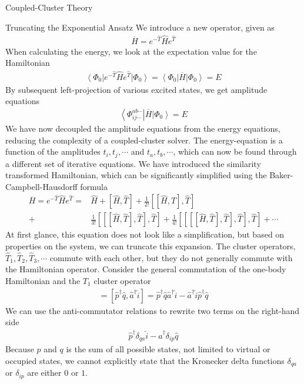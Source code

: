 \documentclass[twoside,english]{uiofysmaster}
\begin{document}
\begin{chapter}{Coupled-Cluster Theory}
\begin{section}{Truncating the Exponential Ansatz}
	  	We introduce a new operator, given as 
	  	\begin{align}
	  		\overline H = e^{-\hat T} \hat H e^{\hat T} 
	  	\end{align}
	  	When calculating the energy, we look at the expectation value for the Hamiltonian 
	  	\begin{align}
	  		\left< \Phi_0 \right| e^{-\hat T} \hat H e^{\hat T} \left| \Phi_0 \right> = \left< \Phi_0 \right| \overline H \left| \Phi_0 \right> = E
	  	\end{align}
	  	By subsequent left-projection of various excited states, we get amplitude equations
	  	\begin{align}
	  		\left< \Phi_{ij\cdots}^{ab\cdots} \right| \overline H \left| \Phi_0 \right> = E
	  	\end{align}
	  	We have now decoupled the amplitude equations from the energy equations, reducing the complexity of a coupled-cluster solver. The energy-equation is a function of the amplitudes $t_i, t_j, \cdots$ and $t_a, t_b, \cdots$, which can now be found through a different set of iterative equations. We have introduced the similarity transformed Hamiltonian, which can be significantly simplified using the Baker-Campbell-Hausdorff formula \cite{Crawford}
	  	\begin{align}
	  		\overline H = e^{-\hat T} \hat H e^{\hat T} =& \hat H + [ \hat H, \hat T] + \frac{1}{2!} [[\hat H, \hat T], \hat T] \\ + &\frac{1}{3!} [[[ \hat H, \hat T ], \hat T ], \hat T ] + \frac{1}{4!} [[[[\hat H, \hat T], \hat T], \hat T], \hat T] + \cdots \nonumber
	  	\end{align}
	  	At first glance, this equation does not look like a simplification, but based on properties on the system, we can truncate this expansion. The cluster operators, $\hat T_1, \hat T_2, \hat T_3, \cdots$ commute with each other, but they do not generally commute with the Hamiltonian operator. Consider the general commutation of the one-body Hamiltonian and the $T_1$ cluster operator
	  	\begin{align}
	  		[\hat H_0, \hat T_1] = [\hat p^\dagger \hat q, \hat a^\dagger \hat i] = \hat p^\dagger \hat q \hat a^\dagger \hat i - \hat a^\dagger \hat i \hat p^\dagger \hat q
	  	\end{align}
	  	We can use the anti-commutator relations to rewrite two terms on the right-hand side
	  	\begin{align}
	  		\hat p^\dagger \delta_{qa} \hat i - \hat a^\dagger \delta_{ip} \hat q
	  	\end{align}
	  	Because $p$ and $q$ is the sum of all possible states, not limited to virtual or occupied states, we cannot explicitly state that the Kronecker delta functions $\delta_{qa}$ or $\delta_{ip}$ are either $0$ or $1$. 


\end{section}
\end{chapter}
\end{document}
